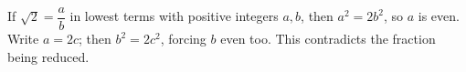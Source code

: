 If $\sqrt2=\dfrac{a}{b}$ in lowest terms with positive integers $a,b$, then $a^2=2b^2$, so $a$ is even. Write $a=2c$; then $b^2=2c^2$, forcing $b$ even too. This contradicts the fraction being reduced.
